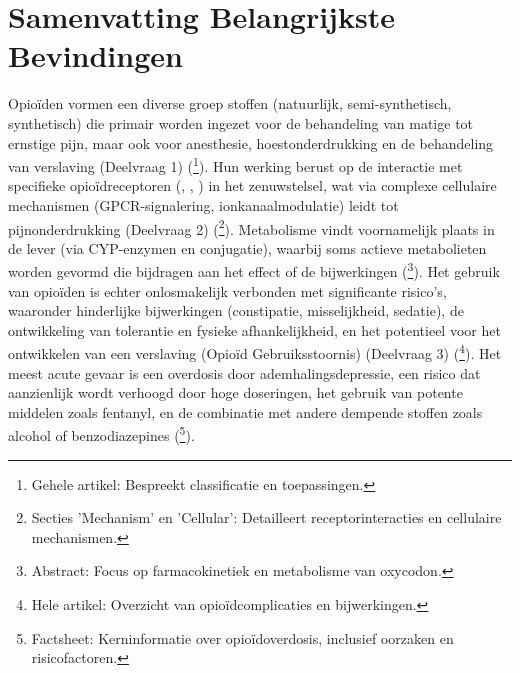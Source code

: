 \documentclass[11pt, a4paper]{report} %
\begin{document}
\section{Samenvatting Belangrijkste Bevindingen}
Opioïden vormen een diverse groep stoffen (natuurlijk, semi-synthetisch, synthetisch) die primair worden ingezet voor de behandeling van matige tot ernstige pijn, maar ook voor anesthesie, hoestonderdrukking en de behandeling van verslaving (Deelvraag 1) (\cite{Gupta2010ChemistryOpioids}\footnote{Gehele artikel: Bespreekt classificatie en toepassingen.}). Hun werking berust op de interactie met specifieke opioïdreceptoren (\textmu, \textkappa, \textdelta) in het zenuwstelsel, wat via complexe cellulaire mechanismen (GPCR-signalering, ionkanaalmodulatie) leidt tot pijnonderdrukking (Deelvraag 2) (\cite{StatPearlsOpioidReceptor}\footnote{Secties 'Mechanism' en 'Cellular': Detailleert receptorinteracties en cellulaire mechanismen.}). Metabolisme vindt voornamelijk plaats in de lever (via CYP-enzymen en conjugatie), waarbij soms actieve metabolieten worden gevormd die bijdragen aan het effect of de bijwerkingen (\cite{Samer2019OxycodonePathway}\footnote{Abstract: Focus op farmacokinetiek en metabolisme van oxycodon.}). Het gebruik van opioïden is echter onlosmakelijk verbonden met significante risico's, waaronder hinderlijke bijwerkingen (constipatie, misselijkheid, sedatie), de ontwikkeling van tolerantie en fysieke afhankelijkheid, en het potentieel voor het ontwikkelen van een verslaving (Opioïd Gebruiksstoornis) (Deelvraag 3) (\cite{Benyamin2008OpioidComplications}\footnote{Hele artikel: Overzicht van opioïdcomplicaties en bijwerkingen.}). Het meest acute gevaar is een overdosis door ademhalingsdepressie, een risico dat aanzienlijk wordt verhoogd door hoge doseringen, het gebruik van potente middelen zoals fentanyl, en de combinatie met andere dempende stoffen zoals alcohol of benzodiazepines (\cite{WHO2023Opioid}\footnote{Factsheet: Kerninformatie over opioïdoverdosis, inclusief oorzaken en risicofactoren.}).
\end{document}
